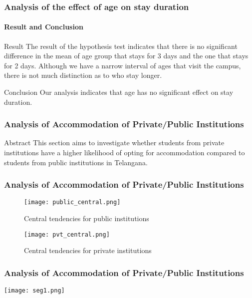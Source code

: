 \documentclass{beamer}
\begin{document}
\begin{frame}
\frametitle{Analysis of the effect of age on
stay duration}
\framesubtitle{Result and Conclusion}
\begin{block}{Result}
The result of the hypothesis test indicates that there is no significant difference in the mean of age group that stays for 3 days and the one that stays for 2 days. Although we have a narrow interval of ages that visit the campus, there is not much distinction as to who stay longer.
\end{block}

\begin{block}{Conclusion}
Our analysis indicates that age has no significant effect on stay duration. 
\end{block}
\end{frame}

\begin{frame}
\frametitle{Analysis of Accommodation of Private/Public Institutions}
\begin{block}{Abstract}
This section aims to investigate whether students from private institutions have a higher likelihood of opting for accommodation compared to students from public institutions in Telangana.
\end{block}
\end{frame}    

\begin{frame}
\frametitle{Analysis of Accommodation of Private/Public Institutions}
\begin{figure}[ht]
        \begin{minipage}[b]{0.45\linewidth}
            \centering
            \texttt{[image: public\_central.png]}
            \caption{Central tendencies for public institutions}
            
            \label{fig:a}
        \end{minipage}
        \hspace{0.5cm}
        \begin{minipage}[b]{0.45\linewidth}
            \centering
            \texttt{[image: pvt\_central.png]}
            \caption{Central tendencies for private institutions}
            \label{fig:b}
        \end{minipage}
    \end{figure}
\end{frame} 

\begin{frame}
\frametitle{Analysis of Accommodation of Private/Public Institutions}
\begin{minipage}{\textwidth}
    \centering
    \texttt{[image: seg1.png]}
    \label{fig:enter-label}
\end{minipage}
\end{frame} 
\end{document}
